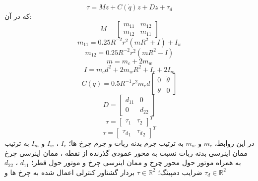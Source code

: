 \begin{equation}
	\tau=M\dot{z} + C(\dot{q})z + Dz + \tau_d
\end{equation}
که در آن:
\begin{equation*}
	M = 
	\begin{bmatrix}
		m_{11} & m_{12} \\
		m_{12} & m_{11} 
	\end{bmatrix}
\end{equation*}
\begin{equation*}
	m_{11} = 0.25R^{-2}r^2(mR^2 +I)+I_w
\end{equation*}
\begin{equation*}
	m_{12} = 0.25R^{-2}r^2(mR^2 -I)
\end{equation*}
\begin{equation*}
	m = m_c + 2m_w
\end{equation*}
\begin{equation*}
	I = m_c d^2 +2m_w R^2 +I_c +2 I_m
\end{equation*}
\begin{equation*}
	C(\dot{q}) = 0.5 R^{-1}r^2m_cd
	\begin{bmatrix}
		0 & \dot{\theta} \\
		\dot{\theta} & 0 
	\end{bmatrix}
\end{equation*}
\begin{equation*}
	D = 
	\begin{bmatrix}
		d_{11} & 0\\
		0 & d_{22} 
	\end{bmatrix}
\end{equation*}
\begin{equation*}
	\tau =
	\begin{bmatrix}
		\tau_1 & \tau_2  
	\end{bmatrix}^T 
\end{equation*}
\begin{equation*}
	\tau =
	\begin{bmatrix}
		{\tau_d}_1 & {\tau_d}_2  
	\end{bmatrix}^T 
\end{equation*}
در این روابط،
$
m_c
$
و
$
m_w
$
به ترتیب جرم بدنه ربات و جرم چرخ ها؛
$
I_c
$
،
$
I_w
$
و
$
I_m
$
به ترتیب ممان اینرسی بدنه ربات نسبت به محور عمودی گذرنده از نقطه ،
ممان اینرسی چرخ به همراه موتور حول محور چرخ و ممان اینرسی چرخ و موتور حول قطر؛ 
$d_{11}$
،
$d_{22}$
ضرایب دمپینگ؛
$
\tau \in \mathbb{R}^2
$
بردار گشتاور کنترلی اعمال شده به چرخ ها و
$
{\tau}_d \in \mathbb{R}^2
$
